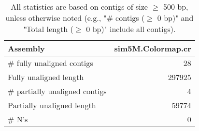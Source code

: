 \documentclass[12pt,a4paper]{article}
\begin{document}
\begin{table}[ht]
\begin{center}
\caption{All statistics are based on contigs of size $\geq$ 500 bp, unless otherwise noted (e.g., "\# contigs ($\geq$ 0 bp)" and "Total length ($\geq$ 0 bp)" include all contigs).}
\begin{tabular}{|l*{1}{|r}|}
\hline
Assembly & sim5M.Colormap.cr \\ \hline
\# fully unaligned contigs & 28 \\ \hline
Fully unaligned length & 297925 \\ \hline
\# partially unaligned contigs & 4 \\ \hline
Partially unaligned length & 59774 \\ \hline
\# N's & 0 \\ \hline
\end{tabular}
\end{center}
\end{table}
\end{document}

